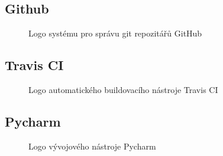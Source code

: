 \documentclass[10pt,titlepage,a4paper]{extarticle}
\begin{document}
\subsection{Github}

\begin{figure}[H]
 \centering
 
 \caption{Logo systému pro správu git repozitářů GitHub}
\end{figure}

\subsection{Travis CI}

\begin{figure}[H]
 \centering
 
 \caption{Logo automatického buildovacího nástroje Travis CI}
\end{figure}

\subsection{Pycharm}

\begin{figure}[H]
 \centering
 
 \caption{Logo vývojového nástroje Pycharm}
\end{figure}


\newpage

\listoffigures
{}

\lstlistoflistings
{}
\end{document}

